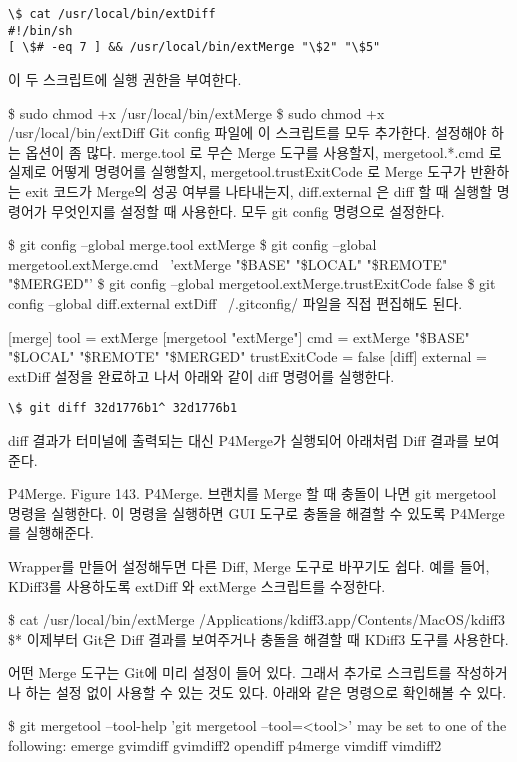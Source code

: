 \documentclass[12pt, a4paper, oneside]{book}
\begin{document}
\begin{verbatim}
\$ cat /usr/local/bin/extDiff
#!/bin/sh
[ \$# -eq 7 ] && /usr/local/bin/extMerge "\$2" "\$5"
\end{verbatim}

이 두 스크립트에 실행 권한을 부여한다.

\$ sudo chmod +x /usr/local/bin/extMerge
\$ sudo chmod +x /usr/local/bin/extDiff
Git config 파일에 이 스크립트를 모두 추가한다. 설정해야 하는 옵션이 좀 많다. merge.tool 로 무슨 Merge 도구를 사용할지, mergetool.*.cmd 로 실제로 어떻게 명령어를 실행할지, mergetool.trustExitCode 로 Merge 도구가 반환하는 exit 코드가 Merge의 성공 여부를 나타내는지, diff.external 은 diff 할 때 실행할 명령어가 무엇인지를 설정할 때 사용한다. 모두 git config 명령으로 설정한다.

\$ git config --global merge.tool extMerge
\$ git config --global mergetool.extMerge.cmd \
  'extMerge "\$BASE" "\$LOCAL" "\$REMOTE" "\$MERGED"'
\$ git config --global mergetool.extMerge.trustExitCode false
\$ git config --global diff.external extDiff
~/.gitconfig/ 파일을 직접 편집해도 된다.

[merge]
  tool = extMerge
[mergetool "extMerge"]
  cmd = extMerge "\$BASE" "\$LOCAL" "\$REMOTE" "\$MERGED"
  trustExitCode = false
[diff]
  external = extDiff
설정을 완료하고 나서 아래와 같이 diff 명령어를 실행한다.

\begin{verbatim}
\$ git diff 32d1776b1^ 32d1776b1
\end{verbatim}

diff 결과가 터미널에 출력되는 대신 P4Merge가 실행되어 아래처럼 Diff 결과를 보여준다.

P4Merge.
Figure 143. P4Merge.
브랜치를 Merge 할 때 충돌이 나면 git mergetool 명령을 실행한다. 이 명령을 실행하면 GUI 도구로 충돌을 해결할 수 있도록 P4Merge를 실행해준다.

Wrapper를 만들어 설정해두면 다른 Diff, Merge 도구로 바꾸기도 쉽다. 예를 들어, KDiff3를 사용하도록 extDiff 와 extMerge 스크립트를 수정한다.

\$ cat /usr/local/bin/extMerge
/Applications/kdiff3.app/Contents/MacOS/kdiff3 \$*
이제부터 Git은 Diff 결과를 보여주거나 충돌을 해결할 때 KDiff3 도구를 사용한다.

어떤 Merge 도구는 Git에 미리 설정이 들어 있다. 그래서 추가로 스크립트를 작성하거나 하는 설정 없이 사용할 수 있는 것도 있다. 아래와 같은 명령으로 확인해볼 수 있다.

\$ git mergetool --tool-help
'git mergetool --tool=<tool>' may be set to one of the following:
        emerge
        gvimdiff
        gvimdiff2
        opendiff
        p4merge
        vimdiff
        vimdiff2
\end{document}

